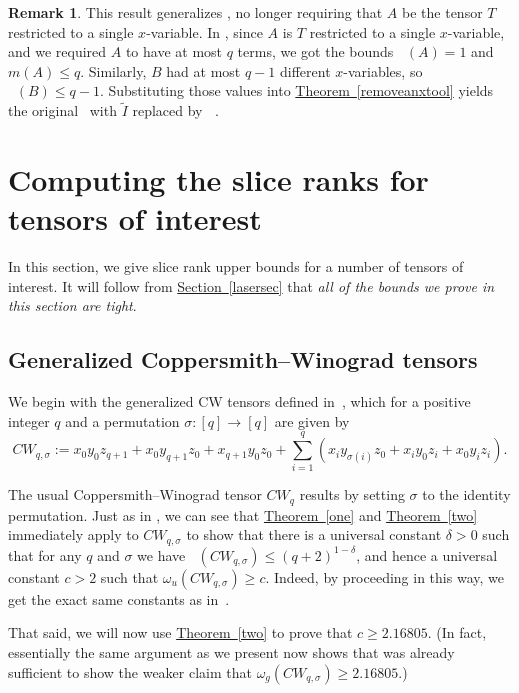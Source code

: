 \documentclass[11pt]{article}
\numberwithin{equation}{section}
\theoremstyle{definition}
\newtheorem{remark}[theorem]{Remark}
\theoremstyle{plain}
\newcommand{\expref}[2]{\hyperref[#2]{#1~\ref{#2}}}
\newcommand{\xr}{\mathop{\operatorname{S_x}}}
\newcommand{\tsr}{\mathop{\tilde{\operatorname{S}}}}
\theoremstyle{definition}
\begin{document}
\begin{remark}
This result generalizes \cite[Theorem~5.1]{aw}, no longer requiring that $A$ be the tensor $T$ restricted to a single $x$-variable. In \cite[Theorem~5.1]{aw}, since $A$ is $T$ restricted to a  single $x$-variable, and we required $A$ to have at most $q$ terms, we got the bounds $\xr(A) = 1$ and $m(A) \leq q$. Similarly, $B$ had at most $q-1$ different $x$-variables, so $\xr(B) \leq q-1$. Substituting those values into \expref{Theorem}{removeanxtool} yields the original~\cite[Theorem~5.1]{aw} with $\tilde{I}$ replaced by $\tsr$. 
\end{remark}





%
\section{Computing the slice ranks for tensors of interest} \label{secfour}

In this section, we give slice rank upper bounds for a number of tensors of interest. It will follow from \expref{Section}{lasersec} that \emph{all of the bounds we prove in this section are tight}.

%
\subsection{Generalized Coppersmith--Winograd tensors} \label{secgcw}

We begin with the generalized CW tensors defined in~\cite{aw}, which for a positive integer $q$ and a permutation $\sigma : [q] \to [q]$ are given by
$$CW_{q,\sigma} := x_0 y_0 z_{q+1} + x_0 y_{q+1} z_0 + x_{q+1} y_0 z_0 + \sum_{i=1}^q (x_i y_{\sigma(i)} z_0 + x_i y_0 z_i + x_0 y_i z_i).$$

The usual Coppersmith--Winograd tensor $CW_q$ results by setting $\sigma$ to the identity permutation. Just as in \cite[Section~7.1]{aw}, we can see that \expref{Theorem}{one} and \expref{Theorem}{two} immediately apply to $CW_{q,\sigma}$ to show that there is a universal constant $\delta>0$ such that for any $q$ and $\sigma$ we have $\tsr(CW_{q,\sigma}) \leq (q+2)^{1-\delta}$, and hence a universal constant $c>2$ such that $\omega_u(CW_{q,\sigma}) \geq c$. Indeed, by proceeding in this way, we get the exact same constants as in~\cite{aw}.

That said, we will now use \expref{Theorem}{two} to prove that $c \geq 2.16805$. (In fact, essentially the same argument as we present now shows that \cite[Theorem 5.2]{aw} was already sufficient to show the weaker claim that $\omega_g(CW_{q,\sigma}) \geq 2.16805$.)
\end{document}
